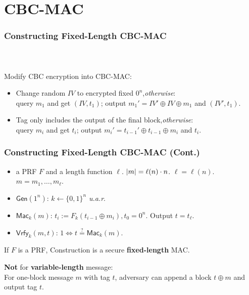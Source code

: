 \section{CBC-MAC}
\begin{frame}\frametitle{Constructing Fixed-Length CBC-MAC}
\begin{columns}[C]
\begin{figure}
\begin{center}

\end{center}
\end{figure}
\begin{figure}
\begin{center}

\end{center}
\end{figure}
\end{columns}
Modify CBC encryption into CBC-MAC:
\begin{itemize}
\item Change random $IV$ to encrypted fixed $0^{n}$,\emph{otherwise}:\\
query $m_1$ and get $(IV, t_1)$; output $m_1' = IV' \oplus  IV \oplus m_{1}$ and $(IV',t_1)$.
\item Tag only includes the output of the final block,\emph{otherwise}:\\
query $m_i$ and get $t_i$; output $m_i' = t_{i-1}' \oplus t_{i-1} \oplus m_{i}$ and $t_i$.
\end{itemize}
\end{frame}
\begin{frame}\frametitle{Constructing Fixed-Length CBC-MAC (Cont.)}
\begin{construction}
\begin{itemize}
\item a PRF $F$ and a length function $\ell$. $\lvert m\rvert = \ell(n)\cdot n$.
$\ell=\ell(n)$. $m = m_1,\dotsc,m_{\ell}$.
\item $\mathsf{Gen}(1^n)$: $k \gets \{0,1\}^n$ \emph{u.a.r}.
\item $\mathsf{Mac}_k(m)$: $t_i := F_k(t_{i-1}\oplus m_i), t_0=0^n$. Output $t = t_\ell$.
\item $\mathsf{Vrfy}_k(m,t)$: $1 \iff t \overset{?}{=} \mathsf{Mac}_k(m)$.
\end{itemize}
\end{construction}
\begin{theorem}
If $F$ is a PRF, Construction is a secure \textbf{fixed-length} MAC.
\end{theorem}
\textbf{Not} for \textbf{variable-length} message:\\
For one-block message $m$ with tag $t$, adversary can append a block $t\oplus m$ and output tag $t$.
\end{frame}
